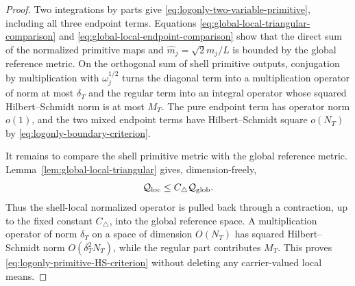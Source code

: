 \begin{proof}
Two integrations by parts give
\eqref{eq:logonly-two-variable-primitive}, including all three endpoint terms.
Equations \eqref{eq:global-local-triangular-comparison} and
\eqref{eq:global-local-endpoint-comparison} show that the direct sum of the
normalized primitive maps and $\widehat m_j=\sqrt2m_j/L$ is bounded by the
global reference metric.  On the orthogonal sum of shell primitive outputs,
conjugation by multiplication with $\omega_j^{1/2}$ turns the diagonal term
into a multiplication operator of norm at most $\delta_T$ and the regular
term into an integral operator whose squared Hilbert--Schmidt norm is at most
$M_T$.  The pure endpoint term has operator norm $o(1)$, and the two mixed
endpoint terms have Hilbert--Schmidt square $o(N_T)$ by
\eqref{eq:logonly-boundary-criterion}.

It remains to compare the shell primitive metric with the global reference
metric.  Lemma~\ref{lem:global-local-triangular} gives, dimension-freely,
\[
\mathcal Q_{\rm loc}\le C_\triangle\mathcal Q_{\rm glob}.
\]
Thus the shell-local normalized operator is pulled back through a contraction,
up to the fixed constant $C_\triangle$, into the global reference space.
A multiplication operator of norm $\delta_T$ on a space of dimension
$O(N_T)$ has squared Hilbert--Schmidt norm $O(\delta_T^2N_T)$, while the
regular part contributes $M_T$.  This proves
\eqref{eq:logonly-primitive-HS-criterion} without deleting any
carrier-valued local means.
\end{proof}
